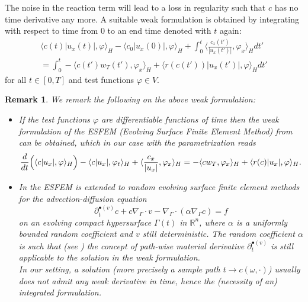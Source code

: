 \documentclass[a4paper,10pt]{article}
\newtheorem{rem}[cor]{Remark}
\newcommand{\R}{\mathbb{R}}
\numberwithin{equation}{section}
\begin{document}
The noise in the reaction term will lead to a loss in regularity such that $c$ has no time derivative any more. A suitable weak formulation is obtained by integrating with respect to time from $0$ to an end time denoted with $t$ again:
\begin{multline}\label{eq3}
\langle c(t) |u_{x}(t)|, \varphi \rangle_{H} - \langle c_{0} |u_{x}(0)|, \varphi \rangle_{H} + \int_{0}^{t} \langle \frac{c_{x}(t')}{|u_{x}(t')|}, \varphi_{x} \rangle_{H} dt'
\\
= \int_{0}^{t} - \langle c(t') w_{T}(t'), \varphi_{x} \rangle_{H} + \langle r(c(t')) |u_{x}(t')|, \varphi \rangle_{H} dt'
\end{multline}
for all $t \in [0,T]$ and test functions $\varphi \in V$.

\begin{rem} We remark the following on the above weak formulation:
\begin{itemize}
 \item
 If the test functions $\varphi$ are differentiable functions of time then the weak formulation of the ESFEM (Evolving Surface Finite Element Method) from \cite[Definition 4.1]{DE07} can be obtained, which in our case with the parametrization reads
 \begin{equation}\label{eq2_time}
 \frac{d}{dt} \Big{(} \langle c |u_{x}|, \varphi \rangle_{H} \Big{)} -\langle c |u_x|, \varphi_t \rangle_{H}
 + \langle \frac{c_{x}}{|u_{x}|}, \varphi_{x} \rangle_{H}
 = - \langle c w_{T}, \varphi_{x} \rangle_{H} + \langle r(c) |u_{x}|, \varphi \rangle_{H}.
 \end{equation}

 \item
 In \cite{DEKR} the ESFEM is extended to random evolving surface finite element methods for the advection-diffusion equation
 $$ \partial^{\bullet(v)}_{t} c + c \nabla_{\Gamma} \cdot v -\nabla_{\Gamma} \cdot (\alpha \nabla_{\Gamma} c) = f $$
 on an evolving compact hypersurface $\Gamma(t)$ in $\R^{n}$, where $\alpha$ is a uniformly bounded random coefficient and $v$ still deterministic. The random coefficient $\alpha$ is such that (see \cite[Assumption 2.1]{DEKR}) the concept of path-wise material derivative $\partial^{\bullet(v)}_{t}$ is still applicable to the solution in the weak formulation. \\
 In our setting, a solution (more precisely a sample path $t \to c(\omega, \cdot) $) usually does not admit any weak derivative in time, hence the (necessity of an) integrated formulation.
\end{itemize}
\end{rem}
\end{document}
